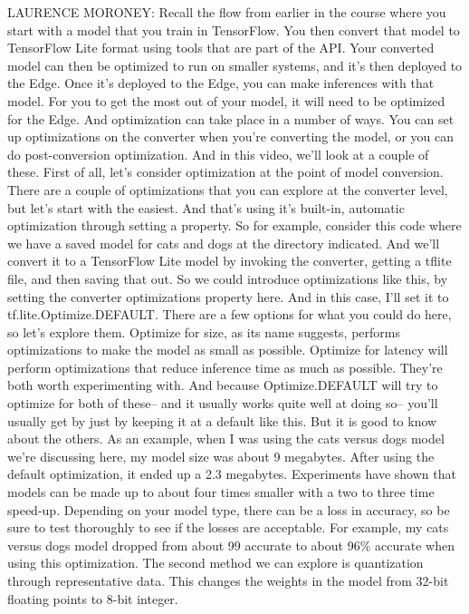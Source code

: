 LAURENCE MORONEY: Recall the flow from earlier
in the course where you start with a model that you train in TensorFlow.
You then convert that model to TensorFlow Lite format
using tools that are part of the API.
Your converted model can then be optimized to run on smaller systems,
and it's then deployed to the Edge.
Once it's deployed to the Edge, you can make inferences with that model.
For you to get the most out of your model,
it will need to be optimized for the Edge.
And optimization can take place in a number of ways.
You can set up optimizations on the converter
when you're converting the model, or you can do post-conversion optimization.
And in this video, we'll look at a couple of these.
First of all, let's consider optimization
at the point of model conversion.
There are a couple of optimizations that you can explore at the converter level,
but let's start with the easiest.
And that's using it's built-in, automatic optimization
through setting a property.
So for example, consider this code where we have a saved model for cats and dogs
at the directory indicated.
And we'll convert it to a TensorFlow Lite model by invoking the converter,
getting a tflite file, and then saving that out.
So we could introduce optimizations like this,
by setting the converter optimizations property here.
And in this case, I'll set it to tf.lite.Optimize.DEFAULT.
There are a few options for what you could do here, so let's explore them.
Optimize for size, as its name suggests, performs optimizations
to make the model as small as possible.
Optimize for latency will perform optimizations
that reduce inference time as much as possible.
They're both worth experimenting with.
And because Optimize.DEFAULT will try to optimize for both of these--
and it usually works quite well at doing so--
you'll usually get by just by keeping it at a default like this.
But it is good to know about the others.
As an example, when I was using the cats versus dogs model
we're discussing here, my model size was about 9 megabytes.
After using the default optimization, it ended up a 2.3 megabytes.
Experiments have shown that models can be made up to about four times smaller
with a two to three time speed-up.
Depending on your model type, there can be a loss in accuracy,
so be sure to test thoroughly to see if the losses are acceptable.
For example, my cats versus dogs model dropped from about 99%
accurate to about 96\% accurate when using this optimization.
The second method we can explore is quantization
through representative data.
This changes the weights in the model from 32-bit floating
points to 8-bit integer.
